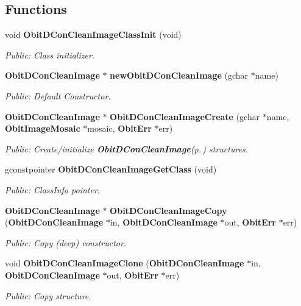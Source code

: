 \subsection*{Functions}
\begin{CompactItemize}
\item 
void {\bf Obit\-DCon\-Clean\-Image\-Class\-Init} (void)
\begin{CompactList}\small\item\em Public: Class initializer. \item\end{CompactList}\item 
{\bf Obit\-DCon\-Clean\-Image} $\ast$ {\bf new\-Obit\-DCon\-Clean\-Image} (gchar $\ast$name)
\begin{CompactList}\small\item\em Public: Default Constructor. \item\end{CompactList}\item 
{\bf Obit\-DCon\-Clean\-Image} $\ast$ {\bf Obit\-DCon\-Clean\-Image\-Create} (gchar $\ast$name, {\bf Obit\-Image\-Mosaic} $\ast$mosaic, {\bf Obit\-Err} $\ast$err)
\begin{CompactList}\small\item\em Public: Create/initialize {\bf Obit\-DCon\-Clean\-Image}{\rm (p.\,\pageref{structObitDConCleanImage})} structures. \item\end{CompactList}\item 
gconstpointer {\bf Obit\-DCon\-Clean\-Image\-Get\-Class} (void)
\begin{CompactList}\small\item\em Public: Class\-Info pointer. \item\end{CompactList}\item 
{\bf Obit\-DCon\-Clean\-Image} $\ast$ {\bf Obit\-DCon\-Clean\-Image\-Copy} ({\bf Obit\-DCon\-Clean\-Image} $\ast$in, {\bf Obit\-DCon\-Clean\-Image} $\ast$out, {\bf Obit\-Err} $\ast$err)
\begin{CompactList}\small\item\em Public: Copy (deep) constructor. \item\end{CompactList}\item 
void {\bf Obit\-DCon\-Clean\-Image\-Clone} ({\bf Obit\-DCon\-Clean\-Image} $\ast$in, {\bf Obit\-DCon\-Clean\-Image} $\ast$out, {\bf Obit\-Err} $\ast$err)
\begin{CompactList}\small\item\em Public: Copy structure. \item\end{CompactList}\item 

\end{CompactItemize}
